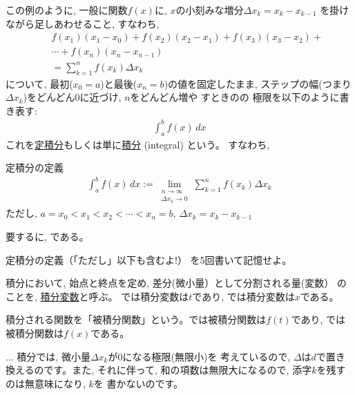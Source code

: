 この例のように, 一般に関数$f(x)$に, $x$の小刻みな増分$\Delta x_k=x_k-x_{k-1}$
を掛けながら足しあわせること, すなわち, 
\begin{eqnarray}
&&f(x_1)(x_1-x_0)+f(x_2)(x_2-x_1)+f(x_3)(x_3-x_2)+\nonumber\\
&&\cdots+f(x_n)(x_n-x_{n-1})\nonumber\\
&&=\sum^{n}_{k=1} f(x_k)\Delta x_k\label{eq:WhatIsIntegral15}
\end{eqnarray}
について, 最初($x_0=a$)と最後($x_n=b$)の値を固定したまま, 
ステップの幅(つまり$\Delta x_k$)をどんどん0に近づけ, $n$をどんどん増や
すときのの
極限を以下のように書き表す:
\begin{eqnarray}
\int_{a}^{b}f(x)\,dx\label{eq:WhatIsIntegral18}
\end{eqnarray}
これを\underline{定積分}もしくは単に\underline{積分} (integral)
という。
すなわち, 
\begin{itembox}{定積分の定義}
\begin{eqnarray}
\int_{a}^{b}f(x)\,dx :=\lim_{\substack{n\rightarrow \infty\\\Delta x_k\rightarrow 0}}\sum^{n}_{k=1} f(x_k)\Delta x_k\label{eq:WhatIsIntegral2}
\end{eqnarray}
ただし, $a=x_0<x_1<x_2<\cdots<x_n=b$, $\Delta x_k=x_k-x_{k-1}$
\end{itembox}
要するに, である。

\begin{q}\label{q:int_define} 定積分の定義（「ただし」以下も含むよ!）
を5回書いて記憶せよ。\end{q}

積分において, 始点と終点を定め, 差分(微小量）として分割される量(変数）
のことを, \underline{積分変数}と呼ぶ。
では積分変数は$t$であり, では積分変数は$x$である。

積分される関数を「被積分関数」という。では被積分関数は$f(t)$であり, 
では被積分関数は$f(x)$である。\hv

\begin{freqmiss}{\small{} ... 積分では, 微小量$\Delta x_k$が0になる極限(無限小)を
考えているので, $\Delta$は$d$で置き換えるのです。また, それに伴って, 
和の項数は無限大になるので, 添字$k$を残すのは無意味になり, $k$を
書かないのです。}\end{freqmiss}

